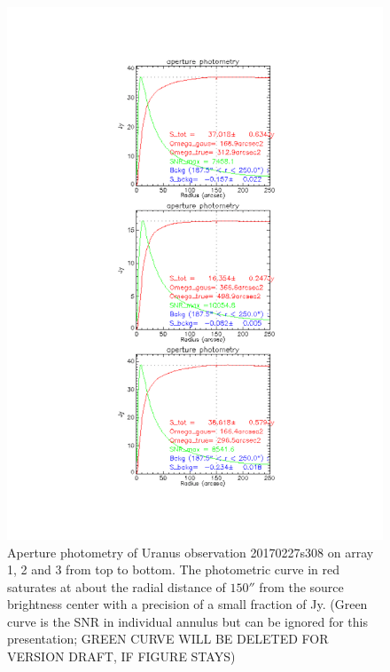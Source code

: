 \begin{figure}
\begin{center}
  \includegraphics[clip, angle=0, scale=0.4]{Figures/Uranus_s308.pdf}
  \caption{Aperture photometry of Uranus observation 20170227s308  on array 1, 2 and 3 from top to bottom.
    The photometric curve in red saturates at about the radial distance of $150''$ from the
    source brightness center with a precision of a small fraction of Jy. (Green curve is the SNR in individual annulus but can be ignored for this
  presentation; GREEN CURVE WILL BE DELETED FOR VERSION DRAFT, IF FIGURE STAYS)}
\label{fig:PhAp}
\end{center}
\end{figure}

